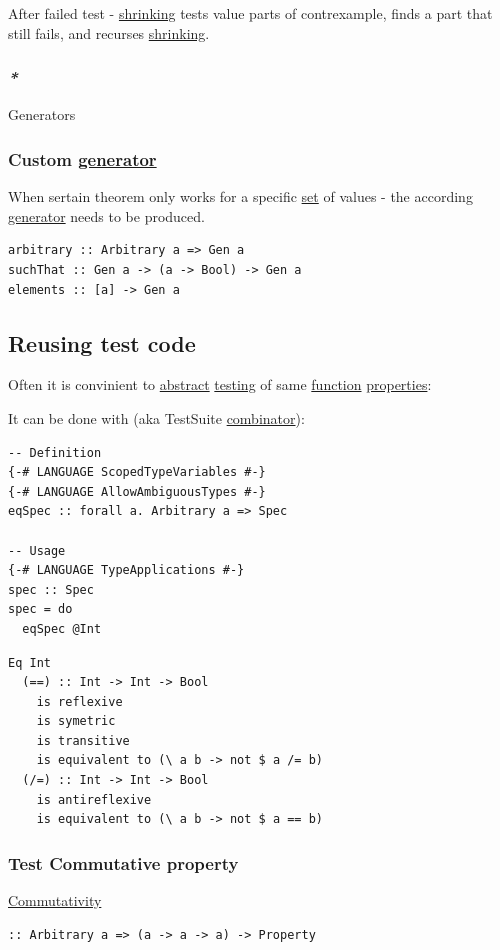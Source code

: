 \documentclass[a4paper,14pt,oneside]{book}
\begin{document}
After failed test - \hyperref[org7bea686]{shrinking} tests value parts of contrexample, finds a part that still fails, and recurses \hyperref[org7bea686]{shrinking}.

\subsubsection{\emph{*}}
\label{sec:orgaa9cdd5}

\label{org2ae7b2f}Generators

\subsubsection{Custom \hyperref[org533814d]{generator}}
\label{sec:orgabb9ae0}
When sertain theorem only works for a specific \hyperref[org1f3ff57]{set} of values - the according \hyperref[org533814d]{generator} needs to be produced.

\begin{verbatim}
arbitrary :: Arbitrary a => Gen a
suchThat :: Gen a -> (a -> Bool) -> Gen a
elements :: [a] -> Gen a
\end{verbatim}

\subsection{\label{orge7fb139}Reusing test code}
\label{sec:orgc726651}
Often it is convinient to \hyperref[orgfa6512d]{abstract} \hyperref[orgdc5a94b]{testing} of same \hyperref[orgbcd9d18]{function} \hyperref[orgcc131cf]{properties}:

It can be done with (aka TestSuite \hyperref[org0e375a2]{combinator}):
\begin{verbatim}
-- Definition
{-# LANGUAGE ScopedTypeVariables #-}
{-# LANGUAGE AllowAmbiguousTypes #-}
eqSpec :: forall a. Arbitrary a => Spec

-- Usage
{-# LANGUAGE TypeApplications #-}
spec :: Spec
spec = do
  eqSpec @Int
\end{verbatim}

\begin{verbatim}
Eq Int
  (==) :: Int -> Int -> Bool
    is reflexive
    is symetric
    is transitive
    is equivalent to (\ a b -> not $ a /= b)
  (/=) :: Int -> Int -> Bool
    is antireflexive
    is equivalent to (\ a b -> not $ a == b)
\end{verbatim}

\subsubsection{\label{org3271daf}Test Commutative property}
\label{sec:org34b5730}
\hyperref[org8e93e7e]{Commutativity}
\begin{verbatim}
:: Arbitrary a => (a -> a -> a) -> Property
\end{verbatim}
\end{document}

